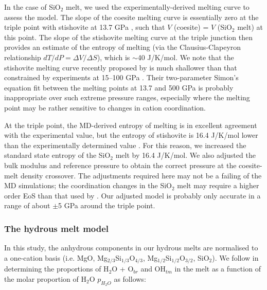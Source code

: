 \documentclass[review]{elsarticle}
\begin{document}
In the case of SiO$_2$ melt, we used the experimentally-derived melting curve to assess the \cite{DKS2013} model. The slope of the coesite melting curve is essentially zero at the triple point with stishovite at 13.7 GPa \citep{ZLGHF1993}, such that $V$ (coesite) = $V$ (SiO$_2$ melt) at this point. The slope of the stishovite melting curve at the triple junction \citep{SL1995} then provides an estimate of the entropy of melting (via the Clausius-Clapeyron relationship $dT/dP = \Delta V / \Delta S$), which is $\sim$40 J/K/mol. We note that the stishovite melting curve recently proposed by \cite{Millotetal2015} is much shallower than that constrained by experiments at 15--100 GPa \citep{SL1995, LAM1983}. Their two-parameter Simon's equation fit between the melting points at 13.7 and 500 GPa is probably inappropriate over such extreme pressure ranges, especially where the melting point may be rather sensitive to changes in cation coordination. 

At the triple point, the MD-derived entropy of melting is in excellent agreement with the experimental value, but the entropy of stishovite is 16.4 J/K/mol lower than the experimentally determined value \citep{SLB2011}. For this reason, we increased the standard state entropy of the SiO$_2$ melt by 16.4 J/K/mol. We also adjusted the bulk modulus and reference pressure to obtain the correct pressure at the coesite-melt density crossover. The adjustments required here may not be a failing of the MD simulations; the coordination changes in the SiO$_2$ melt may require a higher order EoS than that used by \cite{DKS2013}. Our adjusted model is probably only accurate in a range of about $\pm$5 GPa around the triple point. 



\subsubsection{The hydrous melt model}

In this study, the anhydrous components in our hydrous melts are normalised to a one-cation basis (i.e. MgO, Mg$_{2/3}$Si$_{1/3}$O$_{4/3}$, Mg$_{1/2}$Si$_{1/2}$O$_{3/2}$, SiO$_2$). We follow \cite{SS1985} in determining the proportions of H$_2$O + O$_{br}$ and OH$_{tm}$  in the melt as a function of the molar proportion of H$_2$O $p_{H_2O}$ as follows:
 
\end{document}
